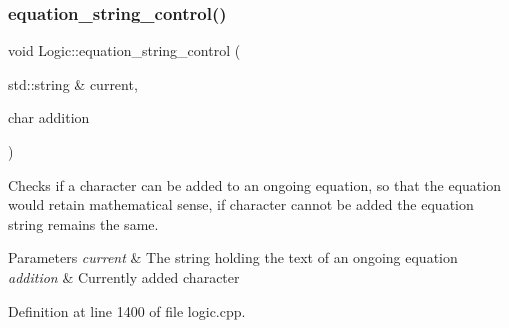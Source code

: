 \subsubsection{\texorpdfstring{equation\_string\_control()}{equation\_string\_control()}}
{\footnotesize\ttfamily void Logic\+::equation\+\_\+string\+\_\+control (\begin{DoxyParamCaption}\item[{std\+::string \&}]{current,  }\item[{char}]{addition }\end{DoxyParamCaption})}



Checks if a character can be added to an ongoing equation, so that the equation would retain mathematical sense, if character cannot be added the equation string remains the same. 


\begin{DoxyParams}{Parameters}
{\em current} & The string holding the text of an ongoing equation \\
\hline
{\em addition} & Currently added character \\
\hline
\end{DoxyParams}


Definition at line 1400 of file logic.\+cpp.


